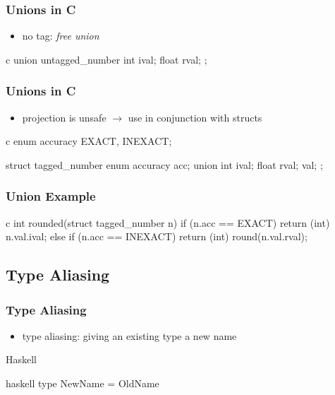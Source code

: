 \documentclass[dvipsnames]{beamer}
\theoremstyle{plain}
\begin{document}
\begin{frame}[fragile]
  \frametitle{Unions in C}

  \begin{itemize}
    \item no tag: \emph{free union}
  \end{itemize}

  \begin{example}
    \begin{pygments}{c}
union untagged_number {
    int ival;
    float rval;
};
    \end{pygments}
  \end{example}
\end{frame}

\begin{frame}[fragile]
  \frametitle{Unions in C}

  \begin{itemize}
    \item projection is unsafe $\rightarrow$ use in conjunction with structs
  \end{itemize}

  \begin{example}
    \begin{pygments}{c}
enum accuracy {EXACT, INEXACT};

struct tagged_number {
    enum accuracy acc;
    union {
        int ival;
        float rval;
    } val;
};
    \end{pygments}
  \end{example}
\end{frame}

\begin{frame}[fragile]
  \frametitle{Union Example}

  \begin{example}
    \begin{pygments}{c}
int rounded(struct tagged_number n)
{
    if (n.acc == EXACT)
        return (int) n.val.ival;
    else if (n.acc == INEXACT)
        return (int) round(n.val.rval);
}
    \end{pygments}
  \end{example}
\end{frame}

\subsection{Type Aliasing}

\begin{frame}[fragile]
  \frametitle{Type Aliasing}

  \begin{itemize}
    \item \alert{type aliasing}: giving an existing type a new name
  \end{itemize}

  \begin{block}{Haskell}
    \begin{pygments}{haskell}
type NewName = OldName
    \end{pygments}
  \end{block}
\end{frame}
\end{document}
